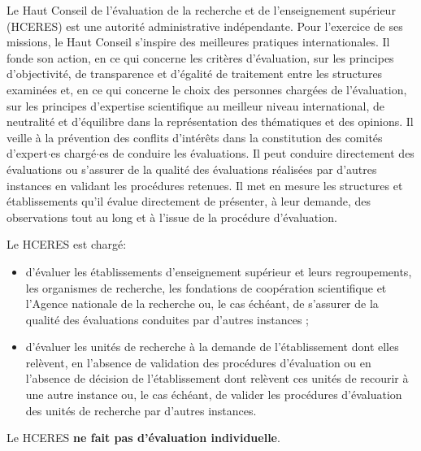 Le Haut Conseil de l'\'evaluation de la recherche et de l'enseignement sup\'erieur (HCERES) est une autorit\'e administrative ind\'ependante. 
Pour l'exercice de ses missions, le Haut Conseil s'inspire des meilleures pratiques internationales. Il fonde son action, en ce qui concerne les crit\`eres d'\'evaluation, sur les principes d'objectivit\'e, 
de transparence et d'\'egalit\'e de traitement entre les structures examin\'ees et, en ce qui concerne le choix des personnes charg\'ees de l'\'evaluation, sur les principes d'expertise scientifique au meilleur niveau international, 
de neutralit\'e et d'\'equilibre dans la repr\'esentation des th\'ematiques et des opinions. Il veille \`a la pr\'evention des conflits d'int\'er\^ets dans la constitution des comit\'es d'expert$\cdot$es charg\'e$\cdot$es de conduire les \'evaluations. 
Il peut conduire directement des \'evaluations ou s'assurer de la qualit\'e des \'evaluations r\'ealis\'ees par d'autres instances en validant les proc\'edures retenues. Il met en mesure les structures et \'etablissements qu'il \'evalue directement de pr\'esenter, 
\`a leur demande, des observations tout au long et \`a l'issue de la proc\'edure d'\'evaluation.

Le HCERES est charg\'e:
\begin{itemize}
\item d'\'evaluer les \'etablissements d'enseignement sup\'erieur et leurs regroupements, les organismes de recherche, les fondations de coop\'eration scientifique et l'Agence nationale de la recherche ou, le cas \'ech\'eant, de s'assurer de la qualit\'e des \'evaluations conduites par d'autres instances ;
\item d'\'evaluer les unit\'es de recherche \`a la demande de l'\'etablissement dont elles rel\`event, en l'absence de validation des proc\'edures d'\'evaluation ou en l'absence de d\'ecision de l'\'etablissement dont rel\`event ces unit\'es de recourir \`a une autre instance ou, le cas \'ech\'eant, 
de valider les proc\'edures d'\'evaluation des unit\'es de recherche par d'autres instances.
\end{itemize}
Le HCERES \textbf{ne fait pas d'évaluation individuelle}. 

\quad

